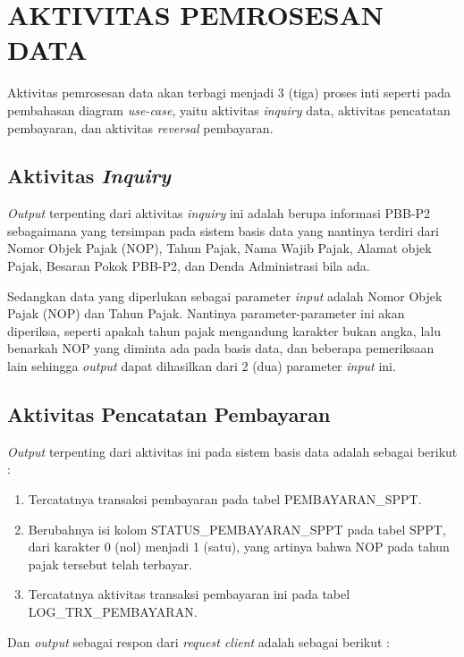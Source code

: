 \documentclass[pdftex,12pt, oneside]{article}
\begin{document}
\section{AKTIVITAS PEMROSESAN DATA}

Aktivitas pemrosesan data akan terbagi menjadi 3 (tiga) proses inti seperti pada pembahasan diagram \textit{use-case}, yaitu aktivitas \textit{inquiry} data, aktivitas pencatatan pembayaran, dan aktivitas \textit{reversal} pembayaran.

\subsection{Aktivitas \textit{Inquiry}}

\textit{Output} terpenting dari aktivitas \textit{inquiry} ini adalah berupa informasi PBB-P2 sebagaimana yang tersimpan pada sistem basis data yang nantinya terdiri dari Nomor Objek Pajak (NOP), Tahun Pajak, Nama Wajib Pajak, Alamat objek Pajak, Besaran Pokok PBB-P2, dan Denda Administrasi bila ada.

Sedangkan data yang diperlukan sebagai parameter \textit{input} adalah Nomor Objek Pajak (NOP) dan Tahun Pajak. Nantinya parameter-parameter ini akan diperiksa, seperti apakah tahun pajak mengandung karakter bukan angka, lalu benarkah NOP yang diminta ada pada basis data, dan beberapa pemeriksaan lain sehingga \textit{output} dapat dihasilkan dari 2 (dua) parameter \textit{input} ini.

\subsection{Aktivitas Pencatatan Pembayaran}

\textit{Output} terpenting dari aktivitas ini pada sistem basis data adalah sebagai berikut :

\begin{enumerate}[1.]
  \item Tercatatnya transaksi pembayaran pada tabel PEMBAYARAN\_SPPT.
  \item Berubahnya isi kolom STATUS\_PEMBAYARAN\_SPPT pada tabel SPPT, dari karakter 0 (nol) menjadi 1 (satu), yang artinya bahwa NOP pada tahun pajak tersebut telah terbayar.
  \item Tercatatnya aktivitas transaksi pembayaran ini pada tabel LOG\_TRX\_PEMBAYARAN.
\end{enumerate}

Dan \textit{output} sebagai respon dari \textit{request client} adalah sebagai berikut :
\end{document}
